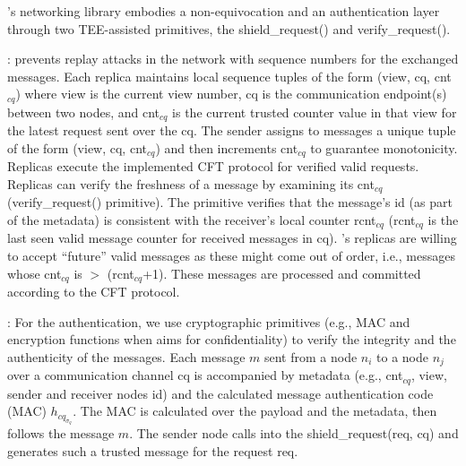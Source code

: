 \label{non-equivocation-design}
\projecttitle{}'s networking library embodies a non-equivocation and an authentication layer through two TEE-assisted primitives, the shield\_request() and verify\_request().%



: \projecttitle{} prevents replay attacks in the network with sequence numbers for the exchanged messages. Each replica maintains local sequence tuples of the form (view, cq, cnt$_{cq}$) where view is the current view number, cq is the communication endpoint(s) between two nodes, and cnt$_{cq}$ is the current trusted counter value in that view for the latest request sent over the cq. The sender assigns to messages a unique tuple of the form (view, cq, cnt$_{cq}$) and then increments cnt$_{cq}$ to guarantee monotonicity. %
Replicas execute the implemented CFT protocol for verified valid requests. Replicas can verify the freshness of a message by examining its cnt$_{cq}$ (verify\_request() primitive). The primitive verifies that the message's id (as part of the metadata) is consistent with the receiver's local counter rcnt$_{cq}$ (rcnt$_{cq}$ is the last seen valid message counter for received messages in cq). \projecttitle{}'s replicas are willing to accept ``future'' valid messages as these might come out of order, i.e., messages whose cnt$_{cq}$ is $>$ (rcnt$_{cq}$+1). These messages are processed and committed according to the CFT protocol. %

: For the authentication, we use cryptographic primitives (e.g., MAC and encryption functions when \projecttitle{} aims for confidentiality) to verify the integrity and the authenticity of the messages. Each message $m$ sent from a node $n_i$ to a node $n_j$ over a communication channel cq is accompanied by metadata (e.g., cnt$_{cq}$, view, sender and receiver nodes id) and the calculated message authentication code (MAC) $h_{cq}_{\sigma}_q$. The MAC is calculated over the payload and the metadata, then follows the message $m$. The sender node calls into the shield\_request(req, cq) and generates such a trusted message for the request req. %

